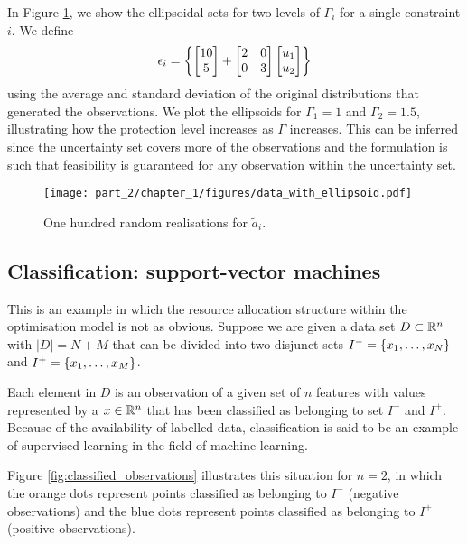 In Figure \ref{fig:ellipsoids}, we show the ellipsoidal sets for two levels of $\Gamma_i$ for a single constraint $i$. We define 
%
\begin{align}
	\epsilon_i = \left\{ \begin{bmatrix} 10 \\ 5 \end{bmatrix} + \begin{bmatrix} 2 & 0 \\ 0 & 3 \end{bmatrix} \begin{bmatrix} u_1 \\ u_2 \end{bmatrix} \right \}
\end{align}
%
using the average and standard deviation of the original distributions that generated the observations. We plot the ellipsoids for $\Gamma_1 = 1$ and $\Gamma_2 = 1.5$, illustrating how the protection level increases as $\Gamma$ increases. This can be inferred since the uncertainty set covers more of the observations and the formulation is such that feasibility is guaranteed for any observation within the uncertainty set. 
%
\begin{figure}
	\texttt{[image: part\_2/chapter\_1/figures/data\_with\_ellipsoid.pdf]}
	\caption{One hundred random realisations for $\tilde{a}_i$.} \label{fig:ellipsoids}
\end{figure}
%


\subsection{Classification: support-vector machines}

This is an example in which the resource allocation structure within the optimisation model is not as obvious. Suppose we are given a data set $D \subset \mathbb{R}^{n}$ with $|D| = N + M$ that can be divided into two disjunct sets $I^- = \left\{ x_1, \dots, x_N \right \}$ and $I^+ = \left\{ x_1,\dots, x_M \right \}$. 

Each element in $D$ is an observation of a given set of $n$ features with values represented by a $x \in \mathbb{R}^n$ that has been classified as belonging to set $I^-$ and $I^+$. Because of the availability of labelled data, classification is said to be an example of supervised learning in the field of machine learning. 

Figure \ref{fig:classified_observations} illustrates this situation for $n = 2$, in which the orange dots represent points classified as belonging to $I^-$ (negative observations) and the blue dots represent points classified as belonging to $I^+$ (positive observations).

